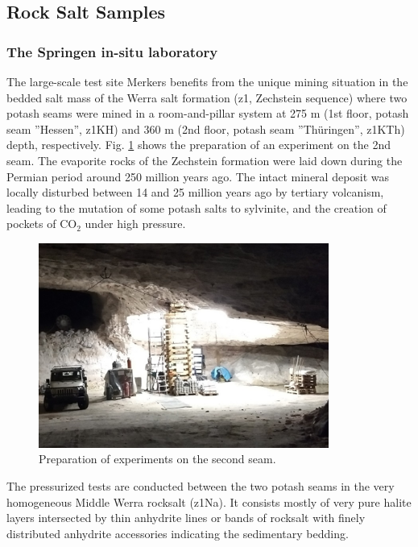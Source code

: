 \subsection{Rock Salt Samples}
\label{subsec:salt}

\subsubsection{The Springen in-situ laboratory}
\label{sec:springen}

The large-scale test site Merkers benefits from the unique mining situation in the bedded salt mass of the Werra salt formation (z1, Zechstein sequence) where two potash seams were mined in a room-and-pillar system at 275 m (1st floor, potash seam ''Hessen'', z1KH) and 360 m (2nd floor, potash seam ''Thüringen'', z1KTh) depth, respectively. Fig. \ref{fig:springenlab} shows the preparation of an experiment on the 2nd seam. The evaporite rocks of the Zechstein formation were laid down during the Permian period around 250 million years ago. The intact mineral deposit was locally disturbed between 14 and 25 million years ago by tertiary volcanism, leading to the mutation of some potash salts to sylvinite, and the creation of pockets of CO$_2$ under high pressure.

\begin{figure}[ht!]
\centering
\includegraphics[width=0.85\textwidth]{figures/springen2ndseam.png}
\caption{Preparation of experiments on the second seam.}
\label{fig:springenlab}
\end{figure}

The pressurized tests are conducted between the two potash seams in the very homogeneous Middle Werra rocksalt (z1Na). It consists mostly of very pure halite layers intersected by thin anhydrite lines or bands of rocksalt with finely distributed anhydrite accessories indicating the sedimentary bedding. 

